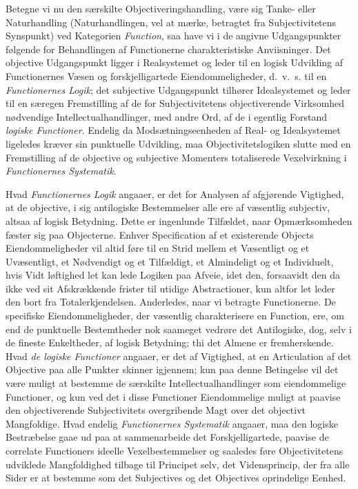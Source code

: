 \documentclass[12pt]{book}
\newcommand{\opage}[1]{\marginnote{\footnotesize\textit{[#1]}}}
\begin{document}
Betegne vi nu den særskilte Objectiveringshandling, være sig Tanke- eller Naturhandling
(Naturhandlingen, vel at mærke, betragtet fra Subjectivitetens Synspunkt) ved Kategorien
\emph{Function}, saa have vi i de angivne Udgangspunkter følgende for Behandlingen af Functionerne
charakteristiske Anviisninger. Det objective Udgangspunkt ligger i Realsystemet og leder til en logisk
Udvikling af Functionernes Væsen og forskjelligartede Eiendommeligheder, d.\ v.\ s. til en
\emph{Functionernes Logik}; det subjective Udgangspunkt tilhører Idealsystemet og leder til en særegen
Fremstilling af de for Subjectivitetens objectiverende Virksomhed nødvendige Intellectualhandlinger,
med andre Ord, af de i egentlig Forstand \emph{logiske Functioner}. Endelig da Modsætningseenheden af
Real- og Idealsystemet ligeledes kræver sin punktuelle Udvikling, maa Objectivitetslogiken slutte med
en Fremstilling af de objective og subjective Momenters totaliserede Vexelvirkning i
\emph{Functionernes Systematik}.

Hvad \emph{Functionernes Logik} angaaer, er det for Analysen af afgjørende Vigtighed, at de objective,
i sig antilogiske Bestemmelser alle ere af væsentlig subjectiv, altsaa af logisk Betydning. Dette er
ingenlunde Tilfældet, naar Opmærksomheden fæster sig paa Objecterne. Enhver Specification af et
existerende Objects Eiendommeligheder vil altid føre til en Strid mellem et Væsentligt og et
Uvæsentligt, et Nødvendigt og et Tilfældigt, et Almindeligt og et Individuelt, hvis Vidt%
\opage{274} løftighed let kan lede Logiken paa Afveie, idet den, forsaavidt den da ikke ved sit Afskrækkende
frister til utidige Abstractioner, kun altfor let leder den bort fra Totalerkjendelsen. Anderledes,
naar vi betragte Functionerne. De specifiske Eiendommeligheder, der væsentlig charakterisere en
Function, ere, om end de punktuelle Bestemtheder nok saameget vedrøre det Antilogiske, dog, selv i de
fineste Enkeltheder, af logisk Betydning; thi det Almene er fremherskende. Hvad \emph{de logiske
Functioner} angaaer, er det af Vigtighed, at en Articulation af det Objective paa alle Punkter skinner
igjennem; kun paa denne Betingelse vil det være muligt at bestemme de særskilte Intellectualhandlinger
som eiendommelige Functioner, og kun ved det i disse Functioner Eiendommelige muligt at paavise den
objectiverende Subjectivitets overgribende Magt over det objectivt Mangfoldige. Hvad endelig
\emph{Functionernes Systematik} angaaer, maa den logiske Bestræbelse gaae ud paa at sammenarbeide det
Forskjelligartede, paavise de correlate Functioners ideelle Vexelbestemmelser og saaledes føre
Objectivitetens udviklede Mangfoldighed tilbage til Principet selv, det Vidensprincip, der fra alle
Sider er at bestemme som det Subjectives og det Objectives oprindelige Eenhed.
\end{document}

